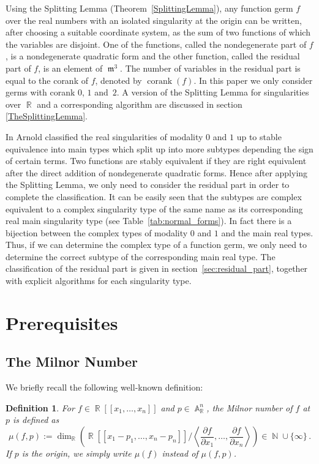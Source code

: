 \documentclass[noend]{amsproc}
\newtheorem{defn}[theorem]{Definition}
\DeclareMathOperator{\m}{\mathfrak{m}}
\DeclareMathOperator{\corank}{corank}
\DeclareMathOperator{\N}{\mathbb{N}}
\DeclareMathOperator{\R}{\mathbb{R}}
\DeclareMathOperator{\A}{\mathbb{A}}
\begin{document}
Using the Splitting Lemma (Theorem~\ref{SplittingLemma}), any function germ $f$
over the real numbers with an isolated singularity at the origin can be
written, after choosing a suitable coordinate system, as the sum of two
functions of which the variables are disjoint. One of the functions, called the
nondegenerate part of $f$, is a nondegenerate quadratic form and the other
function, called the residual part of $f$, is an element of $\m^3$. The number
of variables in the residual part is equal to the corank of $f$, denoted by
$\corank(f)$. In this paper we only consider germs with corank $0$, $1$
and~$2$.  A version of the Splitting Lemma for singularities over $\R$ and a
corresponding algorithm are discussed in section \ref{TheSplittingLemma}.

In \cite{AVG1985} Arnold classified the real singularities of modality $0$ and
$1$ up to stable equivalence into main types which split up into more subtypes
depending the sign of certain terms. Two functions are stably equivalent if
they are right equivalent after the direct addition of nondegenerate quadratic
forms.  Hence after applying the Splitting Lemma,  we only need to consider the
residual part in order to complete the classification.   It can be easily seen
that the subtypes are complex equivalent to a complex singularity type of the
same name as its corresponding real main singularity type (see
Table~\ref{tab:normal_forms}). In fact there is a bijection between the complex
types of modality $0$ and $1$ and the main real types.  Thus, if we can
determine the complex type of a function germ, we only need to determine the
correct subtype of the corresponding main real type. The classification of the
residual part is given in section~\ref{sec:residual_part}, together with
explicit algorithms for each singularity type.


\section{Prerequisites}%
\label{sec:prerequisites}

\subsection{The Milnor Number}%
\label{subsec:milnor_number}

We briefly recall the following well-known definition:

\begin{defn}
For $f \in \R[[x_1,\ldots,x_n]]$ and $p \in \A_{\R}^n$, the
\emph{Milnor number} of $f$ at $p$ is defined as
\[
\mu(f, p) := \dim_{\R}
\left( \R[[x_1-p_1, \ldots, x_n-p_n]] \bigg/
\left\langle \frac{\partial f}{\partial x_1}, \ldots,
\frac{\partial f}{\partial x_n} \right\rangle \right)
\in \N \cup \{\infty\} \,.
\]
If $p$ is the origin, we simply write $\mu(f)$ instead of $\mu(f, p)$.
\end{defn}
\end{document}
